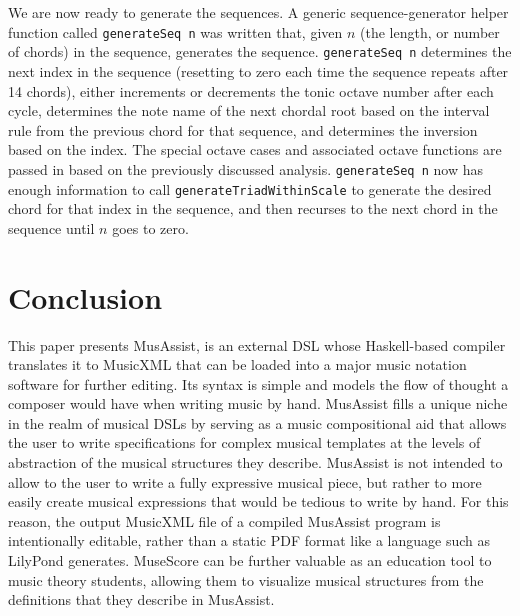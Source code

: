 \documentclass{article}
\begin{document}
We are now ready to generate the sequences. A generic sequence-generator helper function called \verb.generateSeq n. was written that, given $n$ (the length, or number of chords) in the sequence, generates the sequence. \verb.generateSeq n. determines the next index  in the sequence (resetting to zero each  time the sequence repeats after 14 chords), either  increments or decrements the tonic octave number after each cycle, determines the note name of the next chordal root based on the interval rule from the previous chord for that sequence, and determines the inversion based on the index. The special octave cases and associated octave functions are passed in based on the previously discussed analysis. \verb.generateSeq n. now has enough information to call  \verb.generateTriadWithinScale. to generate the desired chord for that index in the sequence, and then recurses to the next chord in the sequence until $n$ goes to zero. 

\section{Conclusion}

This paper presents MusAssist, is an external DSL whose Haskell-based compiler translates it to MusicXML that can be loaded into a major music notation software for further editing. Its syntax is simple and models the flow of thought a composer would have when writing music by hand. MusAssist fills a unique niche in the realm of musical DSLs by serving as a music compositional aid that allows the user to write specifications for complex musical templates at the levels of abstraction of the musical structures they describe. MusAssist is not intended to allow to the user to write a fully expressive musical piece, but rather to more easily create musical expressions that would be tedious to write by hand. For this reason, the output MusicXML file of a compiled MusAssist program is intentionally editable, rather than a static PDF format like a language such as LilyPond generates. MuseScore can be further valuable as an education tool to music theory students, allowing them to visualize musical structures from the definitions that they describe in MusAssist.
\end{document}
